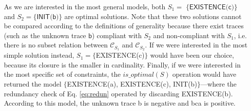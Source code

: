 As we are interested in the most general models, both $S_1=$ $\{\textsf{EXISTENCE(c)}\}$ and $S_2=$$\{\textsf{INIT(b)}\}$ are optimal solutions. Note that these two solutions cannot be compared according to the definitions of generality because there exist traces (such as the unknown trace $\textsf{b}$) compliant with $S_2$ and non-compliant with $S_1$, i.e. there is no subset relation between $\mathcal{C}_{S_1}$ and $\mathcal{C}_{S_2}$.
If we were interested in the most simple solution instead, $S_1=\{$\textsf{EXISTENCE(c)}$\}$ would have been our choice, because its closure is the smaller in cardinality.
%
Finally, if we were interested in the most specific set of constraints, the ${is\_optimal}(S)$ operation would have returned the model $\{$\textsf{EXISTENCE(a), EXISTENCE(c), INIT(b)}$\}$---where the redundancy check of Eq. \eqref{eq:redun} operated by discarding \textsf{EXISTENCE(b)}. According to this model, the unknown trace \textsf{b} is negative and \textsf{bca} is positive. 


%
%
%
%


